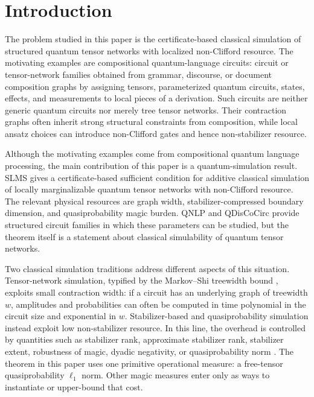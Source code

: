 \section{Introduction}

The problem studied in this paper is the certificate-based classical simulation of structured quantum tensor networks with localized non-Clifford resource. The motivating examples are compositional quantum-language circuits: circuit or tensor-network families obtained from grammar, discourse, or document composition graphs by assigning tensors, parameterized quantum circuits, states, effects, and measurements to local pieces of a derivation. Such circuits are neither generic quantum circuits nor merely tree tensor networks. Their contraction graphs often inherit strong structural constraints from composition, while local ansatz choices can introduce non-Clifford gates and hence non-stabilizer resource.

Although the motivating examples come from compositional quantum language processing, the main contribution of this paper is a quantum-simulation result. SLMS gives a certificate-based sufficient condition for additive classical simulation of locally marginalizable quantum tensor networks with non-Clifford resource. The relevant physical resources are graph width, stabilizer-compressed boundary dimension, and quasiprobability magic burden. QNLP and QDisCoCirc provide structured circuit families in which these parameters can be studied, but the theorem itself is a statement about classical simulability of quantum tensor networks.

Two classical simulation traditions address different aspects of this situation. Tensor-network simulation, typified by the Markov--Shi treewidth bound \citep{MarkovShi2008}, exploits small contraction width: if a circuit has an underlying graph of treewidth \(w\), amplitudes and probabilities can often be computed in time polynomial in the circuit size and exponential in \(w\). Stabilizer-based and quasiprobability simulation instead exploit low non-stabilizer resource. In this line, the overhead is controlled by quantities such as stabilizer rank, approximate stabilizer rank, stabilizer extent, robustness of magic, dyadic negativity, or quasiprobability norm \citep{PashayanWallmanBartlett2015,BravyiGosset2016,HowardCampbell2017,BravyiEtAl2019,SeddonEtAl2021}. The theorem in this paper uses one primitive operational measure: a free-tensor quasiprobability \(\ell_1\) norm. Other magic measures enter only as ways to instantiate or upper-bound that cost.

